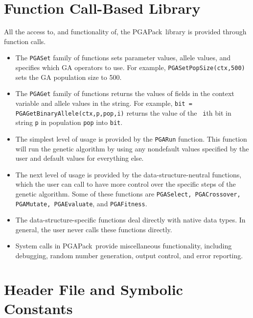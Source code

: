 \documentclass{report}
\newcommand{\pga}{PGAPack}
\begin{document}
\section{Function Call-Based Library}\label{sec:function}

All the access to, and functionality of, the \pga\ library is provided
through function calls.

\begin{itemize}

\item
The {\tt PGASet} family of functions sets parameter values, allele values, and
specifies which GA operators to use.  For example, {\tt PGASetPopSize(ctx,500)}
sets the GA population size to 500.

\item
The {\tt PGAGet} family of functions returns the values of fields in the
context variable and allele values in the string.  For example, {\tt bit =
PGAGetBinaryAllele(ctx,p,pop,i)} returns the value of the {\tt
i}th bit in string {\tt p} in population {\tt pop} into {\tt bit}.

\item
The simplest level of usage is provided by the {\tt PGARun} function.  This
function will run the genetic algorithm by using any nondefault values specified
by the user and default values for everything else.

\item
The next level of usage is provided by the data-structure-neutral functions,
which the user can call to have more control over the specific steps of the
genetic algorithm.  Some of these functions are {\tt PGASelect, PGACrossover,
PGAMutate, PGAEvaluate}, and {\tt PGAFitness}.

\item
The data-structure-specific functions deal directly with native
data types.  In general, the user never calls these functions directly.

\item 
System calls in \pga\ provide miscellaneous functionality, including debugging,
random number generation, output control, and error reporting.

\end{itemize}

\section{Header File and Symbolic Constants}\label{sec:header}
\end{document}
